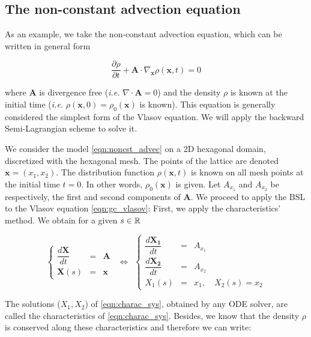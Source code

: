 \documentclass[proc]{edpsmath}
\begin{document}
\subsection{The non-constant advection equation}

As an example, we take the non-constant advection equation, which can be written in general form

\begin{equation}
	\dfrac{\partial \rho}{\partial t} + \mathbf{A} \cdot \nabla_{\mathbf{x}} \rho(\mathbf{x}, t)  = 0
	\label{eqn:noncst_advec}
\end{equation}

where $\mathbf{A}$ is divergence free (\emph{i.e.} $\nabla \cdot \mathbf{A} = 0$) and the density $\rho$ is known at the initial time (\emph{i.e.} $\rho(\mathbf{x}, 0) = \rho_0(\mathbf{x})$ is known). This equation is generally considered the simplest form of the Vlasov equation. We will apply the backward Semi-Lagrangian scheme to solve it.


We consider the model \eqref{eqn:noncst_advec} on a 2D hexagonal domain, discretized with the hexagonal mesh. The points of the lattice are denoted $\mathbf{x}=(x_1, x_2)$. The distribution function $\rho(\mathbf{x},t)$ is known on all mesh points at the initial time $t=0$. In other words, $\rho_0(\mathbf{x})$ is given. Let $A_{x_1}$ and $A_{x_2}$ be respectively, the first and second components of $\mathbf{A}$. We proceed to apply the BSL to the Vlasov equation \eqref{eqn:gc_vlasov}: First, we apply the characteristics' method. We obtain for a given $s \in \mathbb{R} $

\begin{equation}
	\label{eqn:charac_sys}
	\left\lbrace
	\begin{array}{lcl}
	\displaystyle \dfrac{d \mathbf{X}}{dt} &=& \mathbf{A}\\[0.3cm]
	\displaystyle \mathbf{X}(s) &=& \mathbf{x}
	\end{array}\right.
~~\Longleftrightarrow ~~
	\left\lbrace
	\begin{array}{lcl}
	\displaystyle \dfrac{d \mathbf{X_1}}{dt} &=& A_{x_1}\\[0.3cm]
	\displaystyle \dfrac{d \mathbf{X_2}}{dt} &=& A_{x_2}\\[0.3cm]
	\displaystyle X_1(s) &=& x_1, \quad   X_2(s) = x_2
	\end{array}\right.
\end{equation}

The solutions ($X_1, X_2$) of \eqref{eqn:charac_sys}, obtained by any ODE solver, are called the characteristics of \eqref{eqn:charac_sys}. Besides, we know that the density $\rho$ is conserved along these characteristics and therefore we can write:
\end{document}
